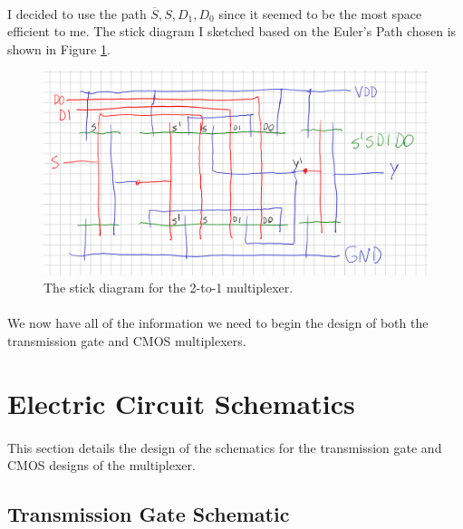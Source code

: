 \documentclass{article}
\begin{document}
  \paragraph{}
  I decided to use the path $\overline{S},S,D_1,D_0$ since it seemed to be the most space efficient to me. The stick diagram I sketched based on the Euler's Path chosen is shown in Figure \ref{fig:stick}.

  \begin{figure}[H]
    \centering
    \includegraphics[width=0.7\linewidth, frame]{screenshots/stick.png}
    \caption{The stick diagram for the 2-to-1 multiplexer.}
    \label{fig:stick}
  \end{figure}

  \paragraph{}
  We now have all of the information we need to begin the design of both the transmission gate and CMOS multiplexers.



\section{Electric Circuit Schematics}
  \paragraph{}
  This section details the design of the schematics for the transmission gate and CMOS designs of the multiplexer.

  \subsection{Transmission Gate Schematic}
\end{document}
